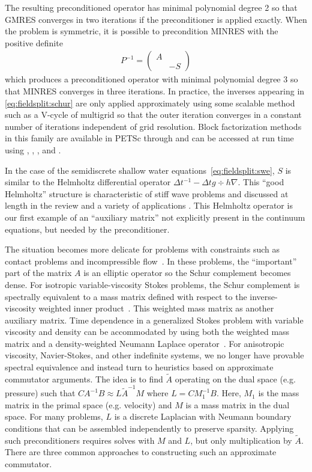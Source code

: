 The resulting preconditioned operator has minimal polynomial degree 2 so that GMRES converges in two iterations if the preconditioner is applied exactly.
When the problem is symmetric, it is possible to precondition MINRES with the positive definite
\begin{align*}
  P^{-1} = \begin{pmatrix} A & \\ & -S \end{pmatrix}
\end{align*}
which produces a preconditioned operator with minimal polynomial degree 3 so that MINRES converges in three iterations.
In practice, the inverses appearing in \eqref{eq:fieldsplit:schur} are only applied approximately using some scalable method such as a V-cycle of multigrid so that the outer iteration converges in a constant number of iterations independent of grid resolution.
Block factorization methods in this family are available in PETSc through  and can be accessed at run time using , , , and .

In the case of the semidiscrete shallow water equations~\eqref{eq:fieldsplit:swe}, $S$ is similar to the Helmholtz differential operator $\Delta t^{-1} - \Delta t g \div h \nabla$.
This ``good Helmholtz'' structure is characteristic of stiff wave problems and discussed at length in the review \cite{knoll2005jfn} and a variety of applications \cite{mousseau2002inc,chacon2008optimal,park2009physics}.
This Helmholtz operator is our first example of an ``auxiliary matrix'' not explicitly present in the continuum equations, but needed by the preconditioner.

The situation becomes more delicate for problems with constraints such as contact problems and incompressible flow~\cite{elman2008tcp}.
In these problems, the ``important'' part of the matrix $A$ is an elliptic operator so the Schur complement becomes dense.
For isotropic variable-viscosity Stokes problems, the Schur complement is spectrally equivalent to a mass matrix defined with respect to the inverse-viscosity weighted inner product~\cite{olshanskii2006analysis}.
This weighted mass matrix as another auxiliary matrix.
Time dependence in a generalized Stokes problem with variable viscosity and density can be accommodated by using both the weighted mass matrix and a density-weighted Neumann Laplace operator~\cite{olshanskii2006uniform}.
For anisotropic viscosity, Navier-Stokes, and other indefinite systems, we no longer have provable spectral equivalence and instead turn to heuristics based on approximate commutator arguments.
The idea is to find $\tilde A$ operating on the dual space (e.g. pressure) such that $C A^{-1} B \approx L \tilde A^{-1} M$ where $L = CM_1^{-1}B$.
Here, $M_1$ is the mass matrix in the primal space (e.g. velocity) and $M$ is a mass matrix in the dual space.
For many problems, $L$ is a discrete Laplacian with Neumann boundary conditions that can be assembled independently to preserve sparsity.
Applying such preconditioners requires solves with $M$ and $L$, but only multiplication by $\tilde A$.
There are three common approaches to constructing such an approximate commutator.

